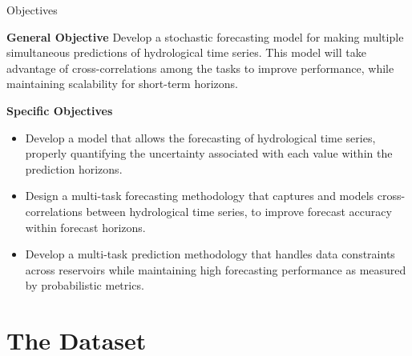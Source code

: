 \begin{frame}{Objectives}
	\begin{block}{\textbf{General Objective}}
			Develop a stochastic forecasting model for making multiple simultaneous predictions of hydrological time series. This model will take advantage of cross-correlations among the tasks to improve performance, while maintaining scalability for short-term horizons.
	\end{block}
	
	\begin{block}{\textbf{Specific Objectives}}
			
			\begin{itemize}
			\item Develop a model that allows the forecasting of hydrological time series, properly quantifying the uncertainty associated with each value within the prediction horizons.
			\item  Design a multi-task forecasting methodology that captures and models cross-correlations between hydrological time series, to improve forecast accuracy within forecast horizons.
			\item Develop a multi-task prediction methodology that handles data constraints across reservoirs while maintaining high forecasting performance as measured by probabilistic metrics.
		\end{itemize}
	\end{block}
\end{frame}

\section{The Dataset}

